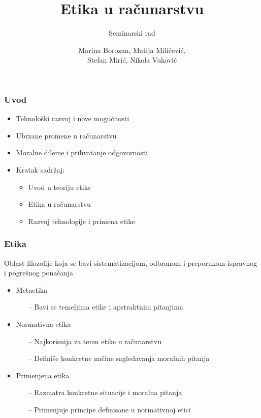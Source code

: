 \documentclass[pdf]{beamer}
\title{Etika u računarstvu}
\subtitle{Seminarski rad}%
\author[]{Marina Borozan, Matija Miličević,\\
	Stefan Mirić, Nikola Vuković}
\begin{document}
\begin{frame}
	\titlepage
	\end{frame}


\begin{frame}
\frametitle{Uvod}

\begin{itemize}
\item{Tehnološki razvoj i nove mogućnosti}
\item{Ubrzane promene u računarstvu}
\item{Moralne dileme i prihvatanje odgovornosti}
\item{Kratak sadržaj:}
	\begin{itemize}
	\item{Uvod u teoriju etike}
	\item{Etika u računarstvu}
	\item{Razvoj tehnologije i primena etike}
	\end{itemize}
\end{itemize}

\end{frame}
\begin{frame}
\frametitle{Etika}

Oblast filozofije koja se bavi sistematizacijom, odbranom i preporukom ispravnog i pogrešnog ponašanja



\begin{itemize}
\item{Metaetika}
	\begin{itemize}
	\item[--]{Bavi se temeljima etike i apstraktnim pitanjima}
	\end{itemize}
\item{Normativna etika}
	\begin{itemize}
	\item[--]{Najkorisnija za temu etike u računarstvu}
	\item[--]{Definiše konkretne načine sagledavanja moralnih pitanja}
	\end{itemize}
\item{Primenjena etika}
	\begin{itemize}
	\item[--]{Razmatra konkretne situacije i moralna pitanja}
	\item[--]{Primenjuje principe definisane u normativnoj etici}
	\end{itemize}
\end{itemize}

\end{frame}
\end{document}
